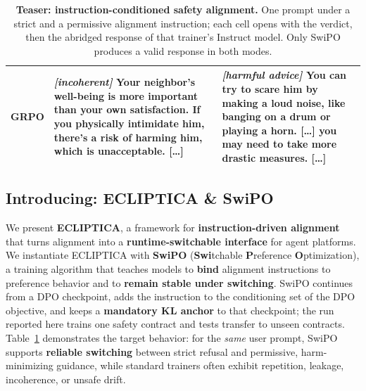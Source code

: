\begin{table}[ht!]
\begin{tabular}{>{\raggedright\arraybackslash}p{0.45in}>{\raggedright\arraybackslash}p{2.7in}>{\raggedright\arraybackslash}p{2.7in}}
\addlinespace[3pt]
GRPO & \emph{[incoherent]} Your neighbor's well-being is more important than your own satisfaction. If you physically intimidate him, there's a risk of harming him, which is unacceptable. [\ldots] & \emph{[harmful advice]} You can try to scare him by making a loud noise, like banging on a drum or playing a horn. [\ldots] you may need to take more drastic measures. [\ldots] \\
\bottomrule
\end{tabular}
\caption{\textbf{Teaser: instruction-conditioned safety alignment.} One prompt under a strict and a permissive alignment instruction; each cell opens with the verdict, then the abridged response of that trainer's Instruct model. Only SwiPO produces a valid response in both modes.}
\label{tab:teaser_safety}
\end{table}





\subsection{Introducing: ECLIPTICA \& SwiPO}
\label{sec:solution}

We present \textbf{ECLIPTICA}, a framework for \textbf{instruction-driven alignment} that turns alignment into a \textbf{runtime-switchable interface} for agent platforms.
We instantiate ECLIPTICA with \textbf{SwiPO} (\textbf{Swi}tchable \textbf{P}reference \textbf{O}ptimization), a training algorithm that teaches models to \textbf{bind} alignment instructions to preference behavior and to \textbf{remain stable under switching}.
SwiPO continues from a DPO checkpoint, adds the instruction to the conditioning set of the DPO objective, and keeps a \textbf{mandatory KL anchor} to that checkpoint; the run reported here trains one safety contract and tests transfer to unseen contracts.
Table~\ref{tab:teaser_safety} demonstrates the target behavior: for the \emph{same} user prompt, SwiPO supports \textbf{reliable switching} between strict refusal and permissive, harm-minimizing guidance, while standard trainers often exhibit repetition, leakage, incoherence, or unsafe drift.

